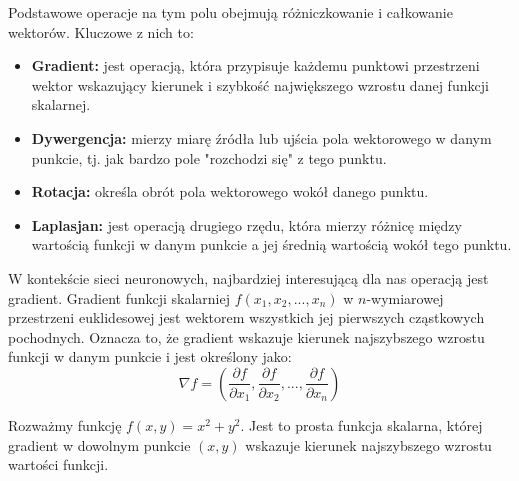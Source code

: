 \begin{enumerate}
Podstawowe operacje na tym polu obejmują różniczkowanie i całkowanie wektorów. Kluczowe z nich to:
\begin{itemize}
    \item \textbf{Gradient:} jest operacją, która przypisuje każdemu punktowi przestrzeni wektor wskazujący kierunek i szybkość największego wzrostu danej funkcji skalarnej.
    \item \textbf{Dywergencja:} mierzy miarę źródła lub ujścia pola wektorowego w danym punkcie, tj. jak bardzo pole "rozchodzi się" z tego punktu.
    \item \textbf{Rotacja:} określa obrót pola wektorowego wokół danego punktu. 
    \item \textbf{Laplasjan:} jest operacją drugiego rzędu, która mierzy różnicę między wartością funkcji w danym punkcie a jej średnią wartością wokół tego punktu. 
\end{itemize}
W kontekście sieci neuronowych, najbardziej interesującą dla nas operacją jest gradient. Gradient funkcji skalarniej \(f(x_1, x_2, ..., x_n)\) w \(n\)-wymiarowej przestrzeni euklidesowej jest wektorem wszystkich jej pierwszych cząstkowych pochodnych. Oznacza to, że gradient wskazuje kierunek najszybszego wzrostu funkcji w danym punkcie i jest określony jako:
\begin{equation}
\nabla f = \left( \frac{\partial f}{\partial x_1}, \frac{\partial f}{\partial x_2}, ..., \frac{\partial f}{\partial x_n} \right)
\end{equation}


Rozważmy funkcję \(f(x, y) = x^2 + y^2\). Jest to prosta funkcja skalarna, której gradient w dowolnym punkcie \((x, y)\) wskazuje kierunek najszybszego wzrostu wartości funkcji.

\begin{figure}[h]
\centering
{}
\end{figure}
\end{enumerate}
